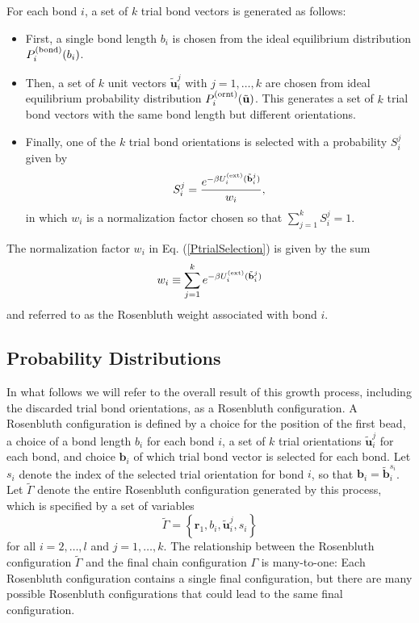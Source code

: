 \documentclass[12pt]{article}
\newcommand{\vv}[1]{\mathbf{#1}}
\newcommand\chain{\Gamma}
\newcommand\Uext{U^{({\rm ext})}}
\newcommand\vbead{\vv{r}}
\newcommand\nbead{l}
\newcommand\vbond{\vv{b}}
\newcommand\rbond{b}
\newcommand\ntrial{k}
\newcommand\vtrial{\tilde{\vv{b}}}
\newcommand\utrial{\tilde{\vv{u}}}
\newcommand\Pbond{P^{({\rm bond})}}
\newcommand\Pornt{P^{({\rm ornt})}}
\newcommand\rconfig{\tilde{\chain}}
\begin{document}
For each bond $i$, a set of $\ntrial$ trial bond vectors is generated as follows:
\begin{itemize}
\item First, a single bond length $\rbond_{i}$ is chosen from the ideal equilibrium 
distribution $\Pbond_{i}(\rbond_{i})$. 
\item Then, a set of $\ntrial$ unit vectors $\utrial_{i}^{j}$ with $j=1,\ldots,\ntrial$ are chosen from ideal equilibrium probability distribution 
$\Pornt_{i}(\utrial)$.  This generates a set of $\ntrial$ trial bond vectors with the same bond length but different orientations.  
\item Finally, one of the $\ntrial$ trial bond orientations is selected with a probability $S^{j}_{i}$ given by
\begin{equation}
    S^{j}_{i} = \frac{e^{-\beta\Uext_{i}(\vtrial^{j}_{i})}}{w_{i}}
    \label{PtrialSelection},
\end{equation}
in which $w_{i}$ is a normalization factor chosen so that $\sum_{j=1}^{\ntrial}S^{j}_{i} = 1$.
\end{itemize} 
The normalization factor $w_{i}$ in Eq. (\ref{PtrialSelection}) is given by the sum
\begin{equation}
     w_{i} \equiv \sum_{j=1}^{\ntrial} e^{ -\beta \Uext_{i}(\vtrial^{j}_{i})}
     \label{RosenbluthBond}
\end{equation}
and referred to as the Rosenbluth weight associated with bond $i$.

\subsection{Probability Distributions}
In what follows we will refer to the overall result of this growth process, including the discarded trial bond orientations, as a Rosenbluth configuration. A Rosenbluth configuration is defined by a choice for the position of the first bead, a choice of a bond length $b_{i}$ for each bond $i$, a set of $\ntrial$ trial orientations $\utrial_{i}^{j}$ for each bond, and choice $\vbond_{i}$ of which trial bond vector is selected for each bond.  Let $s_{i}$ denote the index of the selected trial orientation for bond $i$, so that $\vbond_{i} = \vtrial_{i}^{s_{i}}$.  Let $\rconfig$ denote the entire Rosenbluth configuration generated by this process, which is specified by a set of variables 
\begin{equation}
   \rconfig 
   = \left \{ \vbead_{1},\rbond_{i},\utrial_{i}^{j},s_{i} \right \}
\end{equation}
for all $i=2,\ldots,\nbead$ and $j=1,\ldots,\ntrial$. The relationship between the Rosenbluth configuration $\rconfig$ and the final chain configuration $\chain$ is many-to-one: Each Rosenbluth configuration contains a single final configuration, but there are many possible Rosenbluth configurations that could lead to the same final configuration.
\end{document}
